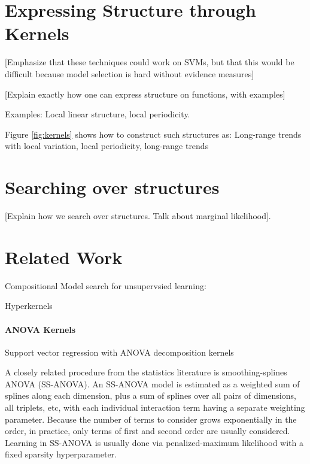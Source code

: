 \documentclass[twoside]{article}
\begin{document}
\section{Expressing Structure through Kernels}

[Emphasize that these techniques could work on SVMs, but that this would be difficult because model selection is hard without evidence measures]

[Explain exactly how one can express structure on functions, with examples]

Examples: Local linear structure, local periodicity.

Figure \ref{fig:kernels} shows how to construct such structures as:  Long-range trends with local variation, local periodicity, long-range trends 






\section{Searching over structures}

[Explain how we search over structures.  Talk about marginal likelihood].

\section{Related Work}

Compositional Model search for unsupervsied learning: \cite{grosse2012exploiting}

Hyperkernels \cite{ong2002hyperkernels}

\paragraph{ANOVA Kernels}

Support vector regression with ANOVA decomposition kernels \cite{stitson1999support}

A closely related procedure from the statistics literature is smoothing-splines ANOVA (SS-ANOVA)\cite{wahba1990spline, gu2002smoothing}. An SS-ANOVA model is estimated as a weighted sum of splines along each dimension, plus a sum of splines over all pairs of dimensions, all triplets, etc, with each individual interaction term having a separate weighting parameter.  Because the number of terms to consider grows exponentially in the order, in practice, only terms of first and second order are usually considered.  Learning in SS-ANOVA is usually done via penalized-maximum likelihood with a fixed sparsity hyperparameter.
\end{document}
